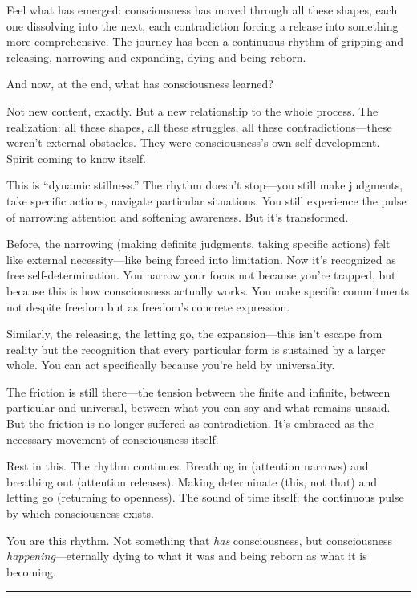 Feel what has emerged: consciousness has moved through all these shapes, each one dissolving into the next, each contradiction forcing a release into something more comprehensive. The journey has been a continuous rhythm of gripping and releasing, narrowing and expanding, dying and being reborn.

And now, at the end, what has consciousness learned?

Not new content, exactly. But a new relationship to the whole process. The realization: all these shapes, all these struggles, all these contradictions---these weren't external obstacles. They were consciousness's own self-development. Spirit coming to know itself.

This is ``dynamic stillness.'' The rhythm doesn't stop---you still make judgments, take specific actions, navigate particular situations. You still experience the pulse of narrowing attention and softening awareness. But it's transformed.

Before, the narrowing (making definite judgments, taking specific actions) felt like external necessity---like being forced into limitation. Now it's recognized as free self-determination. You narrow your focus not because you're trapped, but because this is how consciousness actually works. You make specific commitments not despite freedom but as freedom's concrete expression.

Similarly, the releasing, the letting go, the expansion---this isn't escape from reality but the recognition that every particular form is sustained by a larger whole. You can act specifically because you're held by universality.

The friction is still there---the tension between the finite and infinite, between particular and universal, between what you can say and what remains unsaid. But the friction is no longer suffered as contradiction. It's embraced as the necessary movement of consciousness itself.

Rest in this. The rhythm continues. Breathing in (attention narrows) and breathing out (attention releases). Making determinate (this, not that) and letting go (returning to openness). The sound of time itself: the continuous pulse by which consciousness exists.

You are this rhythm. Not something that \emph{has} consciousness, but consciousness \emph{happening}---eternally dying to what it was and being reborn as what it is becoming.

\begin{center}\rule{0.5\linewidth}{0.5pt}\end{center}

